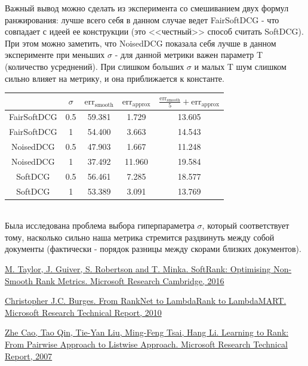 \documentclass[14pt,a4paper]{amsart}
\theoremstyle{definition}
\theoremstyle{definition}
\renewcommand\t{\text}
\begin{document}
Важный вывод можно сделать из эксперимента со смешиванием двух формул ранжирования: лучше всего себя в данном случае ведет FairSoftDCG - что совпадает с идеей ее конструкции (это <<честный>> способ считать SoftDCG). При этом можно заметить, что NoisedDCG показала себя лучше в данном эксперименте при меньших $\sigma$ - для данной метрики важен параметр T (количество усреднений). При слишком больших $\sigma$ и малых T шум слишком сильно влияет на метрику, и она приближается к константе.

\begin{tabular}{|c|c|c|c|c|}
\hline
\t{Метрика} & $\sigma$ & $\t{err}_\t{smooth}$ & $\t{err}_\t{approx}$ & $\frac{\t{err}_\t{smooth}}{5} + \t{err}_\t{approx}$ \\
\hline
FairSoftDCG & 0.5 & 59.381 & 1.729 & 13.605 \\
\hline
FairSoftDCG & 1 & 54.400 & 3.663 & 14.543 \\
\hline
NoisedDCG & 0.5 & 47.903 & 1.667 & 11.248 \\
\hline
NoisedDCG & 1 & 37.492 & 11.960 & 19.584 \\
\hline
SoftDCG & 0.5 & 56.461 & 7.285 & 18.577 \\
\hline
SoftDCG & 1 & 53.389 & 3.091 & 13.769 \\
\hline
\end{tabular} \\

Была исследована проблема выбора гиперпараметра $\sigma$, который соответствует тому, насколько сильно наша метрика стремится раздвинуть между собой документы (фактически - порядок разницы между скорами близких документов). 


\newpage

\begin{thebibliography}{1}

 \href{https://www.microsoft.com/en-us/research/publication/softrank-optimising-non-smooth-rank-metrics/}
{M. Taylor, J. Guiver, S. Robertson and T. Minka. SoftRank: Optimising Non-Smooth Rank Metrics. Microsoft Research Cambridge, 2016}

 \href{https://www.microsoft.com/en-us/research/publication/from-ranknet-to-lambdarank-to-lambdamart-an-overview/}
{Christopher J.C. Burges. From RankNet to LambdaRank to LambdaMART. Microsoft Research Technical Report, 2010}

 \href{https://www.microsoft.com/en-us/research/publication/learning-to-rank-from-pairwise-approach-to-listwise-approach/}
{Zhe Cao, Tao Qin, Tie-Yan Liu, Ming-Feng Tsai, Hang Li. Learning to Rank: From Pairwise Approach to Listwise Approach. Microsoft Research Technical Report, 2007}

\end{thebibliography}
\end{document}
